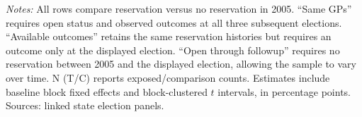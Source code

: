 \begin{table}[!htbp]
\centering
\caption{Sensitivity to follow-up and outcome requirements}
\label{tab:persistence_horizon_sensitivity}

\begin{minipage}{\textwidth}\small
\emph{Notes:} All rows compare reservation versus no reservation in 2005. ``Same GPs'' requires open status and observed outcomes at all three subsequent elections. ``Available outcomes'' retains the same reservation histories but requires an outcome only at the displayed election. ``Open through followup'' requires no reservation between 2005 and the displayed election, allowing the sample to vary over time. N (T/C) reports exposed/comparison counts. Estimates include baseline block fixed effects and block-clustered $t$ intervals, in percentage points. Sources: linked state election panels.
\end{minipage}
\end{table}
\FloatBarrier
